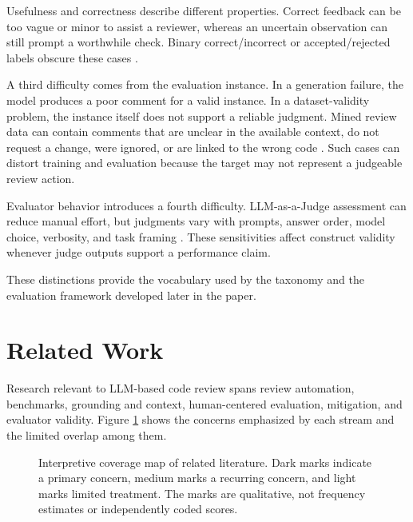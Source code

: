 \documentclass[10pt]{article}
\begin{document}
Usefulness and correctness describe different properties. Correct feedback can be too vague or minor to assist a reviewer, whereas an uncertain observation can still prompt a worthwhile check. Binary correct/incorrect or accepted/rejected labels obscure these cases \cite{p10_sun2025_bitsai_cr,p19_nguyen2025_fine_grained_classification,p39_bosu2015_useful_reviews,p53_tufano2024_code_review_automation_strengths_weaknesses}.

A third difficulty comes from the evaluation instance. In a generation failure, the model produces a poor comment for a valid instance. In a dataset-validity problem, the instance itself does not support a reliable judgment. Mined review data can contain comments that are unclear in the available context, do not request a change, were ignored, or are linked to the wrong code \cite{p52_tufano2021_automating_code_review_activities,p53_tufano2024_code_review_automation_strengths_weaknesses}. Such cases can distort training and evaluation because the target may not represent a judgeable review action.

Evaluator behavior introduces a fourth difficulty. LLM-as-a-Judge assessment can reduce manual effort, but judgments vary with prompts, answer order, model choice, verbosity, and task framing \cite{m04_zheng2023_llm_judge,p29_wang2025_human_evaluators,p31_jiang2025_codejudgebench,p32_zhao2026_bias_loop,p33_he2025_llmjudge_se}. These sensitivities affect construct validity whenever judge outputs support a performance claim.

These distinctions provide the vocabulary used by the taxonomy and the evaluation framework developed later in the paper.




\section{Related Work}

Research relevant to LLM-based code review spans review automation, benchmarks, grounding and context, human-centered evaluation, mitigation, and evaluator validity. Figure \ref{fig:related-work-coverage-map} shows the concerns emphasized by each stream and the limited overlap among them.

\begin{figure}[H]
\centering

\caption{Interpretive coverage map of related literature. Dark marks indicate a primary concern, medium marks a recurring concern, and light marks limited treatment. The marks are qualitative, not frequency estimates or independently coded scores.}
\label{fig:related-work-coverage-map}
\end{figure}
\end{document}
